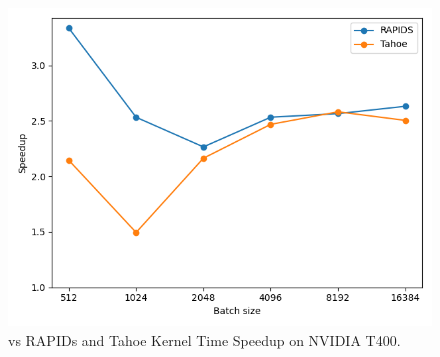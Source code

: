\begin{figure}[htb]
  \centering
  \includegraphics[width=0.75\linewidth]{figures/geomean_speedup_T400_kernel_time.png}
  \caption{\Treebeard{} vs RAPIDs and Tahoe Kernel Time Speedup on NVIDIA T400.}
  \label{Fig:TBvsRAPIDsTahoe_T400_Speedup}
\end{figure}

